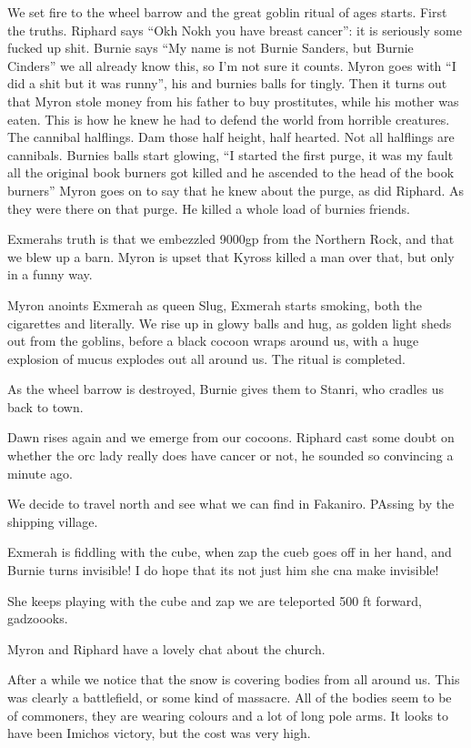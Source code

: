 We set fire to the wheel barrow and the great goblin ritual of ages starts. First the truths. Riphard says ``Okh Nokh you have breast cancer'': it is seriously some fucked up shit. Burnie says ``My name is not Burnie Sanders, but Burnie Cinders'' we all already know this, so I'm not sure it counts. Myron goes with ``I did a shit but it was runny'', his and burnies balls for tingly. Then it turns out that Myron stole money from his father to buy prostitutes, while his mother was eaten. This is how he knew he had to defend the world from horrible creatures. The cannibal halflings. Dam those half height, half hearted. Not all halflings are cannibals. Burnies balls start glowing, ``I started the first purge, it was my fault all the original book burners got killed and he ascended to the head of the book burners'' Myron goes on to say that he knew about the purge, as did Riphard. As they were there on that purge. He killed a whole load of burnies friends.\medskip

Exmerahs truth is that we embezzled 9000gp from the Northern Rock, and that we blew up a barn. Myron is upset that Kyross killed a man over that, but only in a funny way.\medskip

Myron anoints Exmerah as queen Slug, Exmerah starts smoking, both the cigarettes and literally. We rise up in glowy balls and hug, as golden light sheds out from the goblins, before a black cocoon wraps around us, with a huge explosion of mucus explodes out all around us. The ritual is completed.\medskip

As the wheel barrow is destroyed, Burnie gives them to Stanri, who cradles us back to town.\medskip

Dawn rises again and we emerge from our cocoons. Riphard cast some doubt on whether the orc lady really does have cancer or not, he sounded so convincing a minute ago.\medskip

We decide to travel north and see what we can find in Fakaniro. PAssing by the shipping village.\medskip

Exmerah is fiddling with the cube, when zap the cueb goes off in her hand, and Burnie turns invisible! I do hope that its not just him she cna make invisible!\medskip

She keeps playing with the cube and zap we are teleported 500 ft forward, gadzoooks.\medskip

Myron and Riphard have a lovely chat about the church.\medskip

After a while we notice that the snow is covering bodies from all around us. This was clearly a battlefield, or some kind of massacre. All of the bodies seem to be of commoners, they are wearing colours and a lot of long pole arms. It looks to have been Imichos victory, but the cost was very high.

\vspace*{5mm}
